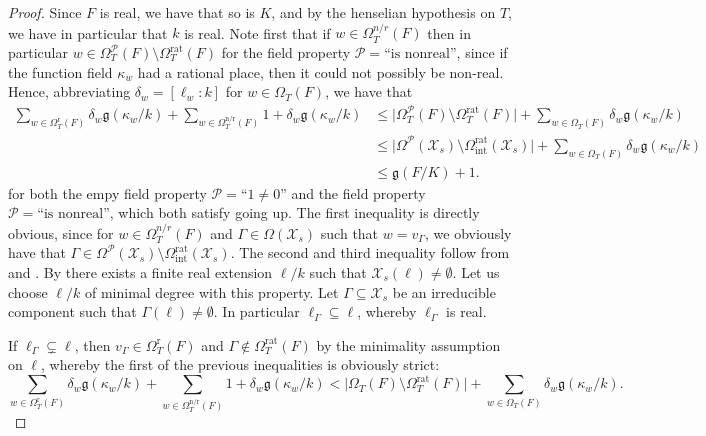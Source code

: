 \documentclass[a4paper,12pt,reqno]{amsart}
\newcommand\mc\mathcal
\theoremstyle{definition}
\numberwithin{equation}{thm}
\renewcommand{\leq}{\leqslant}
\begin{document}
\begin{proof} Since $F$ is real, we have that so is $K$, and by the henselian hypothesis on $T$, we have in particular that $k$ is real.
Note first that if $w \in \Omega^{n/r}_T(F)$ then in particular $w \in \Omega^{\mathcal{P}}_T(F) \setminus  \Omega^{\mathrm{rat}}_T(F)$ for the field property $\mathcal{P}=\text{``is nonreal''}$, since if the function field $\kappa_w$ had a rational place, then it could not possibly be non-real.
Hence, abbreviating $\delta_w=[\ell_w:k]$ for $w\in \Omega_T(F)$, we have that
 \begin{align*} \sum_{w \in \Omega^{\text{r}}_T(F)} \!\!\!\delta_w \mathfrak{g}(\kappa_w/k)+ \!\!\!\!\!\sum_{w \in \Omega^{\text{n/r}}_T(F)}\!\!\! 1+ \delta_w  \mathfrak{g}(\kappa_w/k) 
  &\leq \vert \Omega^{\mathcal{P}}_{T}(F) \setminus \Omega^{\mathrm{rat}}_T(F) \vert + \!\!\! \sum_{w \in \Omega_T(F)} \delta_w \mathfrak{g}(\kappa_w/k) \\
  &\leq  \vert \Omega^{\mathcal{P}}(\mc{X}_s) \setminus \Omega^\mathrm{rat}_{\mathrm{int}}(\mc{X}_s) \vert + \!\!\! \sum_{w \in \Omega_T(F)} \delta_w\mathfrak{g}(\kappa_w/k) \\
  &\leq \mathfrak{g}(F/K) + 1.
  \end{align*}
  for both the empy field property $\mathcal{P}=\text{``$1\neq 0$''}$ and the field property $\mathcal{P}=\text{``is nonreal''}$, which both satisfy going up. The first inequality is directly obvious, since for $w \in \Omega^{n/r}_T(F)$ and $\Gamma \in \Omega(\mc{X}_s)$ such that $w=v_{\Gamma}$, we obviously have that $\Gamma \in \Omega^{\mathcal{P}}(\mc{X}_s) \setminus \Omega^\mathrm{rat}_{\mathrm{int}}(\mc{X}_s)$. The second and third inequality follow from  and .
By  there exists a finite real extension $\ell/k$ such that  $\mathcal{X}_s(\ell) \neq \emptyset$. Let us choose $\ell/k$ of minimal degree with this property.
Let $\Gamma \subseteq \mc{X}_s$ be an irreducible component such that $\Gamma(\ell)\neq \emptyset$. In particular $\ell_\Gamma \subseteq \ell$, whereby $\ell_\Gamma$ is real.

\smallskip

If $\ell_\Gamma \subsetneq \ell$, then $v_\Gamma \in \Omega^{\text{r}}_T(F)$ and $\Gamma \notin \Omega^\mathrm{rat}_T(F)$ by the minimality assumption on $\ell$, whereby the first of the previous inequalities is obviously strict: $$\sum_{w \in \Omega^{\text{r}}_T(F)} \!\! \delta_w\mathfrak{g}(\kappa_w/k)+ \sum_{w \in \Omega^{\text{n/r}}_T(F)}\!\!\! 1+ \delta_w\mathfrak{g}(\kappa_w/k) < \vert \Omega_{T}(F) \setminus \Omega^{\mathrm{rat}}_T(F) \vert + \sum_{w \in \Omega_T(F)} \delta_w \mathfrak{g}(\kappa_w/k).$$


\end{proof}
\end{document}
